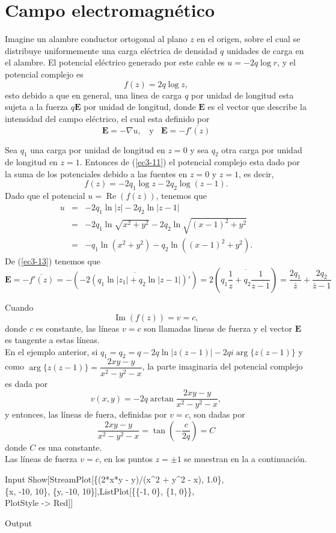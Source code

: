 \section{Campo electromagnético}
Imagine un alambre conductor ortogonal al plano $z$ en el origen, sobre el cual se distribuye uniformemente una carga eléctrica de densidad $q$ unidades de carga en el alambre. El potencial eléctrico generado por este cable es $u = -2q \log r$, y el potencial complejo es
\begin{equation}\label{ec3-12}
	f(z)=2q\log z,
\end{equation}
esto debido a que en general, una linea de carga $q$ por unidad de longitud esta sujeta a la fuerza $q\mathbf{E}$ por unidad de longitud, donde $\mathbf{E}$ es el vector que describe la intensidad del campo eléctrico, el cual esta definido por 
\begin{equation}\label{ec3-13}
	\textbf{E}=-\nabla u, \;\; \mbox{ y }\;\; \textbf{E}=-\overline{f'(z)}
\end{equation} 
\begin{Ejem}
	Sea $q_1$ una carga por unidad de longitud en $z=0$ y sea $q_2$ otra carga por unidad de longitud en $z=1$. Entonces de (\ref{ec3-11}) el potencial complejo esta dado por la suma de los potenciales debido a las fuentes en $z=0$ y $z=1$, es decir,
	\begin{equation}\label{ec3-14}
		f(z)=-2q_1\log z-2q_2\log (z-1).
	\end{equation}
	Dado que el potencial $u=\operatorname{Re}(f(z))$, tenemos que 
	\[
	\begin{array}{ccl}
		u&=&-2q_1\ln |z|-2q_2\ln|z-1|\\
		&=&-2q_1\ln\sqrt{x^2+y^2}-2q_2\ln\sqrt{(x-1)^2+y^2}\\
		&=&-q_1\ln(x^2+y^2)-q_2\ln((x-1)^2+y^2).
	\end{array}
	\]
	De (\ref{ec3-13}) tenemos que 
	$$\mathbf{E}=-\overline{f'(z)}=-(\overline{-2(q_1\ln|z_1|+q_2\ln|z-1|)'})=2\left(\overline{q_1\dfrac{1}{z}+q_2\dfrac{1}{z-1}}\right)=\dfrac{2q_1}{\bar{z}}+\dfrac{2q_2}{\bar{z}-1}$$
	
\end{Ejem}
Cuando $$\operatorname{Im}(f(z))=v=c,$$ donde $c$ es constante, las líneas $v=c$ son llamadas lineas de fuerza y el vector $\mathbf{E}$ es tangente a estas líneas.\\
En el ejemplo anterior, si $q_1=q_2=q-2q\ln|z(z-1)|-2qi\operatorname{arg}\{z(z-1)\}$ y como $\operatorname{arg}\{z(z-1)\}=\dfrac{2xy-y}{x^2-y^2-x}$, la parte imaginaria del potencial complejo es dada por 
$$v(x,y)=-2q\arctan\dfrac{2xy-y}{x^2-y^2-x},$$
y entonces, las líneas de fuera, definidas por $v=c$, son dadas por 
$$\dfrac{2xy-y}{x^2-y^2-x}=\tan\left(-\dfrac{c}{2q}\right)=C$$
donde $C$ es una constante.\\ Las líneas de fuerza $v=c$, en los puntos $z=\pm 1$ se muestran en la a continuación.
\begin{mmaCell}{Input}
	 Show[StreamPlot[\{(2*x*y - y)/(x^2 + y^2 - x), 1.0\},\\\{x, -10, 10\}, \{y, -10, 10\}],ListPlot[\{\{-1, 0\}, \{1, 0\}\}, \\PlotStyle -> Red]]
\end{mmaCell}

\begin{mmaCell}[moregraphics={moreig={scale=0.3}}]{Output}
\end{mmaCell}

\printbibliography[heading=bibintoc]
